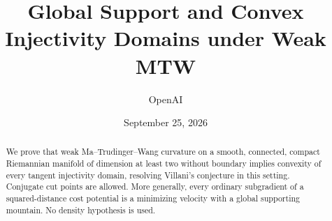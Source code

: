 \documentclass[11pt]{article}
\title{Global Support and Convex Injectivity Domains under Weak MTW}
\author{OpenAI}
\date{September 25, 2026}
\numberwithin{equation}{section}
\theoremstyle{definition}
\theoremstyle{remark}
\begin{document}
\maketitle
\begin{abstract}
We prove that weak Ma--Trudinger--Wang curvature on a smooth, connected,
compact Riemannian manifold of dimension at least two without boundary implies
convexity of every tangent injectivity domain, resolving Villani's conjecture
in this setting. Conjugate cut points are allowed. More generally, every
ordinary subgradient of a squared-distance cost potential is a minimizing
velocity with a global supporting mountain. No density hypothesis is used.
\end{abstract}
\tableofcontents




\appendix

\clearpage


\end{document}

